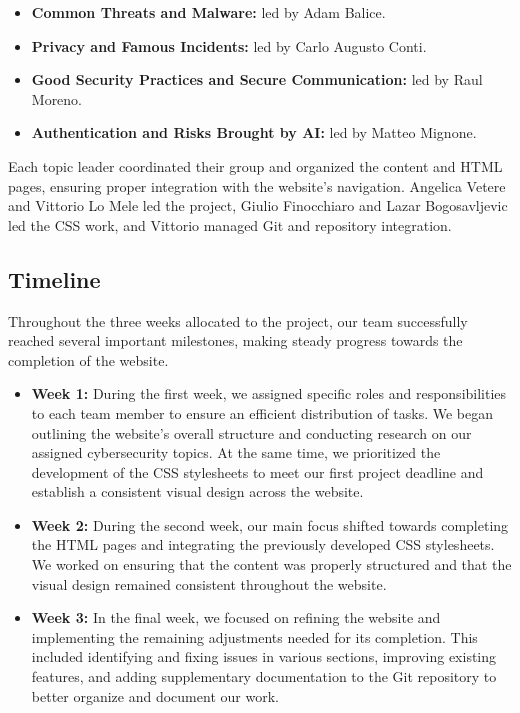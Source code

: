 \begin{itemize}

    \item \textbf{Common Threats and Malware:} led by Adam Balice.
    \item \textbf{Privacy and Famous Incidents:} led by Carlo Augusto Conti.
    \item \textbf{Good Security Practices and Secure Communication:} led by Raul Moreno.
    \item \textbf{Authentication and Risks Brought by AI:} led by Matteo Mignone.
\end{itemize}

Each topic leader coordinated their group and organized the content and HTML pages, ensuring proper integration with the website's navigation.
Angelica Vetere and Vittorio Lo Mele led the project, Giulio Finocchiaro and Lazar Bogosavljevic led the CSS work, and Vittorio managed Git and repository integration.

\subsection{Timeline}
\label{sec:timeline}

Throughout the three weeks allocated to the project, our team successfully reached several important milestones, making steady progress towards the completion of the website.

\begin{itemize}

    \item \textbf{Week 1:} During the first week, we assigned specific roles and responsibilities to each team member to ensure an efficient distribution of tasks. We began outlining the website's overall structure and conducting research on our assigned cybersecurity topics. At the same time, we prioritized the development of the CSS stylesheets to meet our first project deadline and establish a consistent visual design across the website.
    \item \textbf{Week 2:} During the second week, our main focus shifted towards completing the HTML pages and integrating the previously developed CSS stylesheets. We worked on ensuring that the content was properly structured and that the visual design remained consistent throughout the website.
    \item \textbf{Week 3:} In the final week, we focused on refining the website and implementing the remaining adjustments needed for its completion. This included identifying and fixing issues in various sections, improving existing features, and adding supplementary documentation to the Git repository to better organize and document our work.

\end{itemize}

